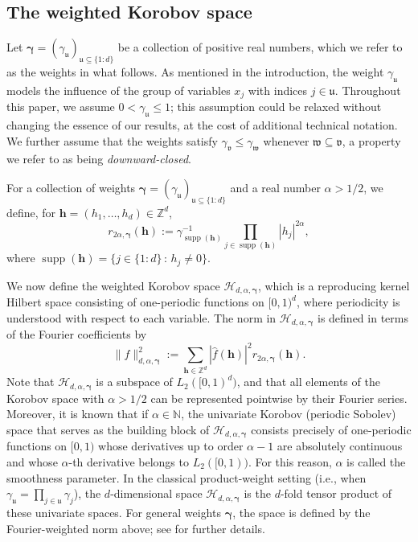 \documentclass[a4paper,11pt]{article}
\newcommand{\bsh}{\boldsymbol{h}}
\newcommand{\bsgamma}{\boldsymbol{\gamma}}
\newcommand{\NN}{\mathbb{N}}
\newcommand{\ZZ}{\mathbb{Z}}
\newcommand{\Hcal}{\mathcal{H}}
\newcommand{\fraku}{\mathfrak{u}}
\DeclareMathOperator{\supp}{supp}
\newcommand{\abs}[1]{\left\vert#1\right\vert}
\begin{document}
\subsection{The weighted Korobov space}
Let $\bsgamma=(\gamma_{\mathfrak{u}})_{\mathfrak{u}\subseteq\{1{:}d\}}$ be a collection of positive real numbers, which we refer to as the weights in what follows. As mentioned in the introduction, the weight $\gamma_{\mathfrak{u}}$ models the influence of the group of variables $x_j$ with indices $j\in\mathfrak{u}$. 
Throughout this paper, we assume $0<\gamma_\fraku\leq 1$; this assumption could be relaxed without changing the essence of our results, at the cost of additional technical notation.
We further assume that the weights satisfy $\gamma_{\mathfrak{v}} \le \gamma_{\mathfrak{w}}$ whenever $\mathfrak{w}\subseteq \mathfrak{v}$, a property we refer to as being \emph{downward-closed}.


For a collection of weights $\bsgamma=(\gamma_{\mathfrak{u}})_{\mathfrak{u}\subseteq\{1{:}d\}}$ and a real number $\alpha>1/2$, we define, for $\bsh=(h_1,\ldots,h_d)\in \ZZ^d$,
\[ 
r_{2\alpha,\bsgamma} (\bsh):=\gamma_{\supp(\bsh)}^{-1}\prod_{j\in \supp(\bsh)} \abs{h_j}^{2\alpha},
\]
where $\supp(\bsh)=\{j\in \{1{:}d\}\, \colon\, h_j\neq 0\}$.

We now define the weighted Korobov space $\Hcal_{d,\alpha,\bsgamma}$, which is a reproducing kernel Hilbert space consisting of one-periodic functions on $[0,1)^d$, where periodicity is understood with respect to each variable. The norm in $\Hcal_{d,\alpha,\bsgamma}$ is defined in terms of the Fourier coefficients by
\[
  \|f\|_{d,\alpha,\bsgamma}^2:=\sum_{\bsh\in\ZZ^d} \abs{\widehat{f}({\bsh})}^2 r_{2\alpha,\bsgamma}(\bsh).
\]
Note that $\Hcal_{d,\alpha,\bsgamma}$ is a subspace of $L_2 ([0,1)^d)$, and that all elements of the Korobov space with $\alpha>1/2$ can be represented pointwise by their Fourier series. Moreover, it is known that if $\alpha\in\NN$, the univariate Korobov (periodic Sobolev) space that serves as the building block of $\Hcal_{d,\alpha,\bsgamma}$ consists precisely of one-periodic functions on $[0,1)$ whose derivatives up to order $\alpha-1$ are absolutely continuous and whose $\alpha$-th derivative belongs to $L_2([0,1))$. For this reason, $\alpha$ is called the smoothness parameter. In the classical product-weight setting (i.e., when $\gamma_{\mathfrak{u}}=\prod_{j\in\mathfrak{u}}\gamma_j$), the $d$-dimensional space $\Hcal_{d,\alpha,\bsgamma}$ is the $d$-fold tensor product of these univariate spaces. For general weights $\bsgamma$, the space is defined by the Fourier-weighted norm above; see \cite{dick2022component} for further details.
\end{document}
